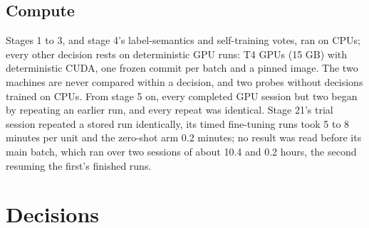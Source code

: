 \documentclass[11pt,a4paper]{article}
\begin{document}
\hypertarget{compute}{%
\subsection{Compute}\label{compute}}

Stages 1 to 3, and stage 4's label-semantics and self-training votes, ran
on CPUs; every other decision rests on deterministic GPU runs: T4 GPUs (15
GB) with deterministic CUDA, one frozen commit per batch and a pinned
image. The two machines are never compared within a decision, and two
probes without decisions trained on CPUs. From stage 5 on, every completed
GPU session but two began by repeating an earlier run, and every repeat
was identical. Stage 21's trial session repeated a stored run identically,
its timed fine-tuning runs took 5 to 8 minutes per unit and the zero-shot
arm 0.2 minutes; no result was read before its main batch, which ran over
two sessions of about 10.4 and 0.2 hours, the second resuming the first's
finished runs.

\hypertarget{decisions}{%
\section{Decisions}\label{decisions}}
\end{document}
